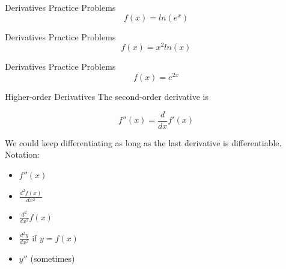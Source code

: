 \documentclass[aspectratio=169]{beamer}
\begin{document}
\begin{frame}{Derivatives Practice Problems}\label{main1}
	\vspace{-4cm}
     \[
    f(x) = ln(e^x)
    \]
\end{frame}

\begin{frame}{Derivatives Practice Problems}\label{main1}
	\vspace{-4cm}
     \[
    f(x) = x^{2}ln(x)
    \]
\end{frame}

\begin{frame}{Derivatives Practice Problems}\label{main1}
	\vspace{-4cm}
     \[
    f(x) = e^{2x}
    \]
\end{frame}

\begin{frame}{Higher-order Derivatives}\label{main1}
The second-order derivative is

\[
f''(x) = \frac{d}{dx} f'(x)
\]

We could keep differentiating as long as the last derivative is differentiable. Notation:
\begin{itemize}
\begin{itemize}
    \item $f''(x)$
    \item $\frac{d^2 f(x)}{dx^2}$
    \item $\frac{d^2}{dx^2} f(x)$
    \item $\frac{d^2 y}{dx^2}$ if $y = f(x)$
    \item $y''$ (sometimes)
\end{itemize}
\end{itemize}
\end{frame}
\end{document}

